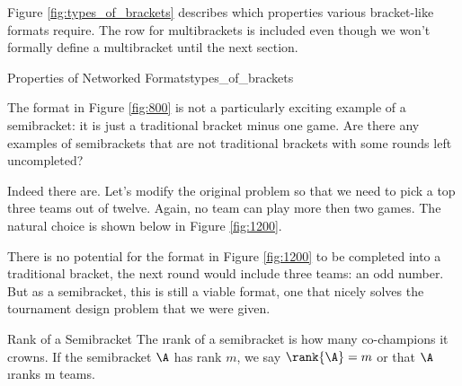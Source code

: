 {    Figure \ref{fig:types_of_brackets} describes which properties various bracket-like formats require. The row for multibrackets is included even though we won't formally define a multibracket until the next section.

    \begin{figg}{Properties of Networked Formats}{types_of_brackets}
        \begin{center}
        \end{center}
    \end{figg} 

    The format in Figure \ref{fig:800} is not a particularly exciting example of a semibracket: it is just a traditional bracket minus one game. Are there any examples of semibrackets that are not traditional brackets with some rounds left uncompleted?

    Indeed there are. Let's modify the original problem so that we need to pick a top three teams out of twelve. Again, no team can play more then two games. The natural choice is shown below in Figure \ref{fig:1200}.
    

    There is no potential for the format in Figure \ref{fig:1200} to be completed into a traditional bracket, the next round would include three teams: an odd number. But as a semibracket, this is still a viable format, one that nicely solves the tournament design problem that we were given.
    
    \begin{definition}{Rank of a Semibracket}{}
        The \i{rank} of a semibracket is how many co-champions it crowns. If the semibracket $\A$ has rank $m$, we say $\rank{\A} = m$ or that $\A$ \i{ranks m teams}.
    \end{definition}

}
